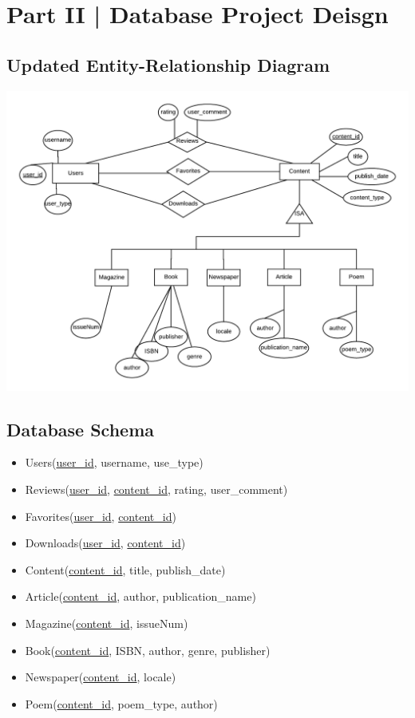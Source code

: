 \documentclass[letter, 12pt, titlepage]{article}
\begin{document}

\section{Part II | Database Project Deisgn}

\subsection{Updated Entity-Relationship Diagram}
	\includegraphics[scale=1]{erd-rev.png}
	\subsection{Database Schema}
		\begin{itemize}
			\item Users(\underline{user\_id}, username, use\_type)
			\item Reviews(\underline{user\_id}, \underline{content\_id}, rating, user\_comment)
			\item Favorites(\underline{user\_id}, \underline{content\_id})
			\item Downloads(\underline{user\_id}, \underline{content\_id})
			\item Content(\underline{content\_id}, title, publish\_date)
			\item Article(\underline{content\_id}, author, publication\_name)
			\item Magazine(\underline{content\_id}, issueNum)
			\item Book(\underline{content\_id}, ISBN, author, genre, publisher)
			\item Newspaper(\underline{content\_id}, locale)
			\item Poem(\underline{content\_id}, poem\_type, author)
		\end{itemize}
\end{document}
